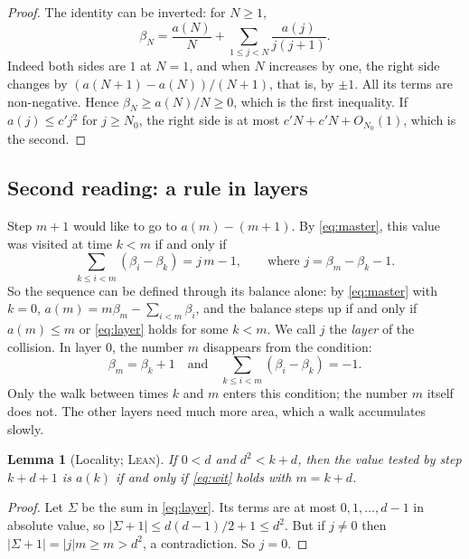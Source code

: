 \documentclass[11pt]{amsart}
\newtheorem{lemma}[theorem]{Lemma}
\theoremstyle{definition}
\newcommand{\LEAN}{\textsc{Lean}}
\begin{document}
\begin{proof}
The identity can be inverted: for $N\ge1$,
\begin{equation}\label{eq:inverse}
  \beta_N=\frac{a(N)}N+\sum_{1\le j<N}\frac{a(j)}{j(j+1)} .
\end{equation}
Indeed both sides are $1$ at $N=1$, and when $N$ increases by one, the right side changes by $(a(N+1)-a(N))/(N+1)$, that is, by $\pm1$. All its terms
are non-negative. Hence $\beta_N\ge a(N)/N\ge0$, which is the first inequality. If $a(j)\le c'j^2$ for $j\ge N_0$, the
right side is at most $c'N+c'N+O_{N_0}(1)$, which is the second.
\end{proof}

\subsection{Second reading: a rule in layers}
Step $m+1$ would like to go to $a(m)-(m+1)$. By \eqref{eq:master}, this value was visited at time $k<m$ if and only if
\begin{equation}\label{eq:layer}
  \sum_{k\le i<m}(\beta_i-\beta_k)=j\,m-1,\qquad\text{where } j=\beta_m-\beta_k-1 .
\end{equation}
So the sequence can be defined through its balance alone: by \eqref{eq:master} with $k=0$,
$a(m)=m\beta_m-\sum_{i<m}\beta_i$, and the balance steps up if and only if $a(m)\le m$ or \eqref{eq:layer} holds for some $k<m$. We
call $j$ the \emph{layer} of the collision. In layer $0$, the number $m$ disappears from the condition:
\begin{equation}\label{eq:wit}
  \beta_m=\beta_k+1\quad\text{and}\quad\sum_{k\le i<m}(\beta_i-\beta_k)=-1 .
\end{equation}
Only the walk between times $k$ and $m$ enters this condition; the number $m$ itself does not. The other layers need
much more area, which a walk accumulates slowly.

\begin{lemma}[Locality; \LEAN]\label{lem:local}
If $0<d$ and $d^2<k+d$, then the value tested by step $k+d+1$ is $a(k)$ if and only if \eqref{eq:wit} holds with $m=k+d$.
\end{lemma}

\begin{proof}
Let $\Sigma$ be the sum in \eqref{eq:layer}. Its terms are at most $0,1,\dots,d-1$ in absolute value, so $|\Sigma+1|\le d(d-1)/2+1\le d^2$. But if
$j\ne0$ then $|\Sigma+1|=|j|m\ge m>d^2$, a contradiction. So $j=0$.
\end{proof}
\end{document}

